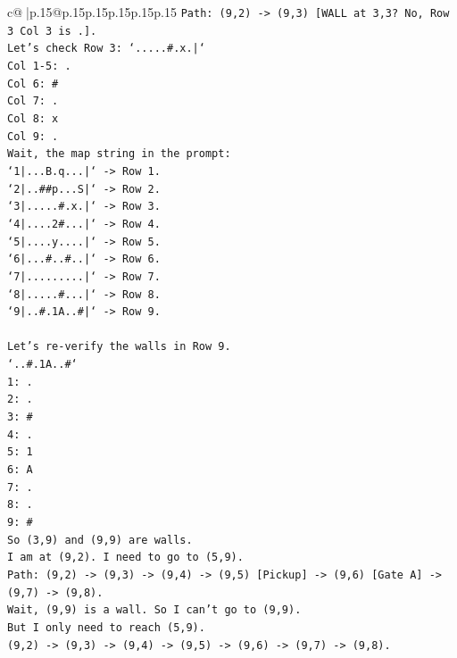 \documentclass{article}
\begin{document}
{\begin{supertabular}{c@{$\;$}|p{.15\linewidth}@{}p{.15\linewidth}p{.15\linewidth}p{.15\linewidth}p{.15\linewidth}p{.15\linewidth}}
{{{\texttt{Path: (9,2) {-}> (9,3) {[}WALL at 3,3? No, Row 3 Col 3 is .{]}.} \\
\texttt{Let's check Row 3: `.....\#.x.|`} \\
\texttt{Col 1{-}5: .} \\
\texttt{Col 6: \#} \\
\texttt{Col 7: .} \\
\texttt{Col 8: x} \\
\texttt{Col 9: .} \\
\texttt{Wait, the map string in the prompt:} \\
\texttt{`1|...B.q...|` {-}> Row 1.} \\
\texttt{`2|..\#\#p...S|` {-}> Row 2.} \\
\texttt{`3|.....\#.x.|` {-}> Row 3.} \\
\texttt{`4|....2\#...|` {-}> Row 4.} \\
\texttt{`5|....y....|` {-}> Row 5.} \\
\texttt{`6|...\#..\#..|` {-}> Row 6.} \\
\texttt{`7|.........|` {-}> Row 7.} \\
\texttt{`8|.....\#...|` {-}> Row 8.} \\
\texttt{`9|..\#.1A..\#|` {-}> Row 9.} \\
\\ 
\texttt{Let's re{-}verify the walls in Row 9.} \\
\texttt{`..\#.1A..\#`} \\
\texttt{1: .} \\
\texttt{2: .} \\
\texttt{3: \#} \\
\texttt{4: .} \\
\texttt{5: 1} \\
\texttt{6: A} \\
\texttt{7: .} \\
\texttt{8: .} \\
\texttt{9: \#} \\
\texttt{So (3,9) and (9,9) are walls.} \\
\texttt{I am at (9,2). I need to go to (5,9).} \\
\texttt{Path: (9,2) {-}> (9,3) {-}> (9,4) {-}> (9,5) {[}Pickup{]} {-}> (9,6) {[}Gate A{]} {-}> (9,7) {-}> (9,8).} \\
\texttt{Wait, (9,9) is a wall. So I can't go to (9,9).} \\
\texttt{But I only need to reach (5,9).} \\
\texttt{(9,2) {-}> (9,3) {-}> (9,4) {-}> (9,5) {-}> (9,6) {-}> (9,7) {-}> (9,8).} \\
}}}
\end{supertabular}}
\end{document}
